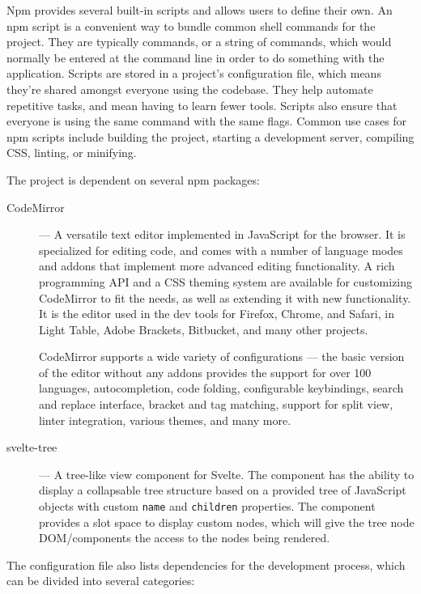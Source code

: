 \documentclass[english,bachelors,forcepolishlogotype]{wizthesis}
\newcommand{\paraphrase}[1]{#1}
\begin{document}
Npm provides several built-in scripts and allows users to define their own.
\paraphrase{An npm script is a convenient way to bundle common shell commands
for the project. They are typically commands, or a string of commands, which
would normally be entered at the command line in order to do something with the
application. Scripts are stored in a project's configuration file, which means
they're shared amongst everyone using the codebase. They help automate
repetitive tasks, and mean having to learn fewer tools. Scripts also ensure that
everyone is using the same command with the same flags. Common use cases for npm
scripts include building the project, starting a development server, compiling
CSS, linting, or minifying.}

The project is dependent on several npm packages:
\begin{description}
  \item[CodeMirror] \cite{codemirror} --- \paraphrase{A versatile text editor
  implemented in JavaScript for the browser. It is specialized for editing code,
  and comes with a number of language modes and addons that implement more
  advanced editing functionality. A rich programming API and a CSS theming
  system are available for customizing CodeMirror to fit the needs, as well as
  extending it with new functionality. It is the editor used in the dev tools
  for Firefox, Chrome, and Safari, in Light Table, Adobe Brackets, Bitbucket,
  and many other projects.}

  CodeMirror supports a wide variety of configurations --- the basic version of
  the editor without any addons provides the support for over 100 languages,
  autocompletion, code folding, configurable keybindings, search and replace
  interface, bracket and tag matching, support for split view, linter
  integration, various themes, and many more.
  \item[svelte-tree] \cite{svelte-tree} --- A tree-like view component for
  Svelte. The component has the ability to display a collapsable tree structure
  based on a provided tree of JavaScript objects with custom \texttt{name} and
  \texttt{children} properties. The component provides a slot space to display
  custom nodes, which will give the tree node DOM/components the access to the
  nodes being rendered.
\end{description}
The configuration file also lists dependencies for the development process,
which can be divided into several categories:
\end{document}
